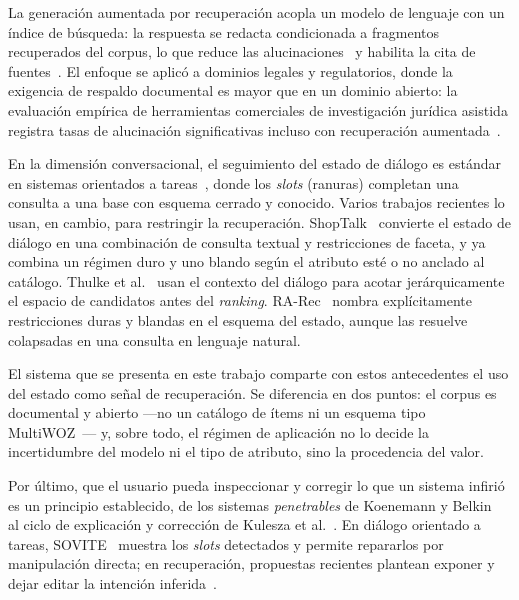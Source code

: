 \documentclass{llncs}
\begin{document}
La generación aumentada por recuperación acopla un modelo de lenguaje con un
índice de búsqueda: la respuesta se redacta condicionada a fragmentos
recuperados del corpus, lo que reduce las alucinaciones~\cite{shuster2021retrieval} y habilita la
cita de fuentes~\cite{lewis2020rag,gao2024survey}. El enfoque se aplicó a
dominios legales y regulatorios, donde la exigencia de respaldo documental es
mayor que en un dominio abierto: la evaluación empírica de herramientas
comerciales de investigación jurídica asistida registra tasas de
alucinación significativas incluso con recuperación
aumentada~\cite{magesh2024hallucination}.

En la dimensión conversacional, el seguimiento del estado de diálogo es
estándar en sistemas orientados a tareas~\cite{young2013pomdp,williams2013pomdp},
donde los \emph{slots} (ranuras) completan una consulta a una base con esquema cerrado y
conocido. Varios trabajos recientes lo usan, en cambio, para restringir la
recuperación. ShopTalk~\cite{manku2022shoptalk}
convierte el estado de diálogo en una combinación de consulta textual y
restricciones de faceta, y ya combina un régimen duro y uno blando según el
atributo esté o no anclado al catálogo. Thulke et al.~\cite{thulke2021dstc9}
usan el contexto del diálogo para acotar jerárquicamente el espacio de
candidatos antes del \emph{ranking}. RA-Rec~\cite{kemper2024rarec} nombra
explícitamente restricciones duras y blandas en el esquema del estado, aunque
las resuelve colapsadas en una consulta en lenguaje natural.

El sistema que se presenta en este trabajo comparte con estos antecedentes el uso
del estado como señal de
recuperación. Se diferencia en dos puntos: el corpus es documental y abierto
---no un catálogo de ítems ni un esquema tipo MultiWOZ~\cite{budzianowski2018multiwoz}--- y, sobre todo, el
régimen de aplicación no lo decide la incertidumbre del modelo ni el tipo de
atributo, sino la procedencia del valor.

Por último, que el usuario pueda inspeccionar y corregir lo que un sistema
infirió es un principio establecido, de los sistemas \emph{penetrables} de Koenemann y
Belkin~\cite{koenemann1996case} al ciclo de explicación y corrección de
Kulesza et al.~\cite{kulesza2015principles}. En diálogo orientado a tareas,
SOVITE~\cite{li2020sovite} muestra los \emph{slots} detectados y permite repararlos
por manipulación directa; en recuperación, propuestas recientes plantean
exponer y dejar editar la intención inferida~\cite{anand2023context}.
\end{document}
